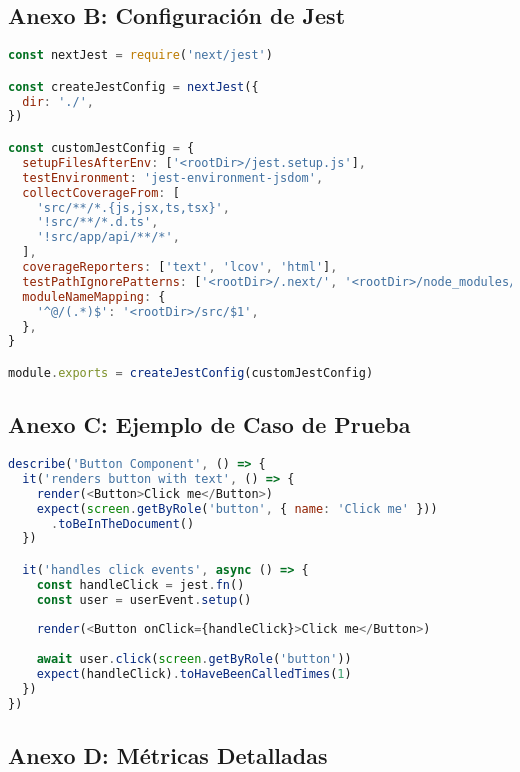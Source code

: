 \documentclass[12pt,a4paper]{article}
\begin{document}
\subsection{Anexo B: Configuración de Jest}

\begin{lstlisting}[language=javascript, caption=jest.config.js]
const nextJest = require('next/jest')

const createJestConfig = nextJest({
  dir: './',
})

const customJestConfig = {
  setupFilesAfterEnv: ['<rootDir>/jest.setup.js'],
  testEnvironment: 'jest-environment-jsdom',
  collectCoverageFrom: [
    'src/**/*.{js,jsx,ts,tsx}',
    '!src/**/*.d.ts',
    '!src/app/api/**/*',
  ],
  coverageReporters: ['text', 'lcov', 'html'],
  testPathIgnorePatterns: ['<rootDir>/.next/', '<rootDir>/node_modules/'],
  moduleNameMapping: {
    '^@/(.*)$': '<rootDir>/src/$1',
  },
}

module.exports = createJestConfig(customJestConfig)
\end{lstlisting}

\subsection{Anexo C: Ejemplo de Caso de Prueba}

\begin{lstlisting}[language=javascript, caption=Ejemplo de Test Unitario]
describe('Button Component', () => {
  it('renders button with text', () => {
    render(<Button>Click me</Button>)
    expect(screen.getByRole('button', { name: 'Click me' }))
      .toBeInTheDocument()
  })

  it('handles click events', async () => {
    const handleClick = jest.fn()
    const user = userEvent.setup()
    
    render(<Button onClick={handleClick}>Click me</Button>)
    
    await user.click(screen.getByRole('button'))
    expect(handleClick).toHaveBeenCalledTimes(1)
  })
})
\end{lstlisting}

\subsection{Anexo D: Métricas Detalladas}
\end{document}
